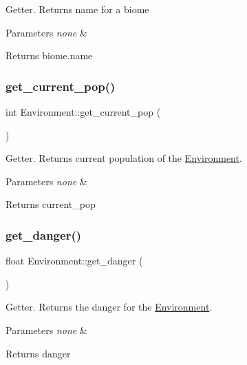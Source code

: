 Getter. Returns name for a biome 
\begin{DoxyParams}{Parameters}
{\em none} & \\
\hline
\end{DoxyParams}
\begin{DoxyReturn}{Returns}
biome.\+name 
\end{DoxyReturn}
\mbox{\label{class_environment_a5e4d853c509dc2e7d321254c0f553a6f}} 
\subsubsection{\texorpdfstring{get\+\_\+current\+\_\+pop()}{get\_current\_pop()}}
{\footnotesize\ttfamily int Environment\+::get\+\_\+current\+\_\+pop (\begin{DoxyParamCaption}{ }\end{DoxyParamCaption})}

Getter. Returns current population of the \hyperlink{class_environment}{Environment}. 
\begin{DoxyParams}{Parameters}
{\em none} & \\
\hline
\end{DoxyParams}
\begin{DoxyReturn}{Returns}
current\+\_\+pop 
\end{DoxyReturn}
\mbox{\label{class_environment_ade4e5787c137e4646d260198cfc4dee5}} 
\subsubsection{\texorpdfstring{get\+\_\+danger()}{get\_danger()}}
{\footnotesize\ttfamily float Environment\+::get\+\_\+danger (\begin{DoxyParamCaption}{ }\end{DoxyParamCaption})}

Getter. Returns the danger for the \hyperlink{class_environment}{Environment}. 
\begin{DoxyParams}{Parameters}
{\em none} & \\
\hline
\end{DoxyParams}
\begin{DoxyReturn}{Returns}
danger 
\end{DoxyReturn}
\mbox{\label{class_environment_afedf443586624eaf57fa5f118295bc30}} 
